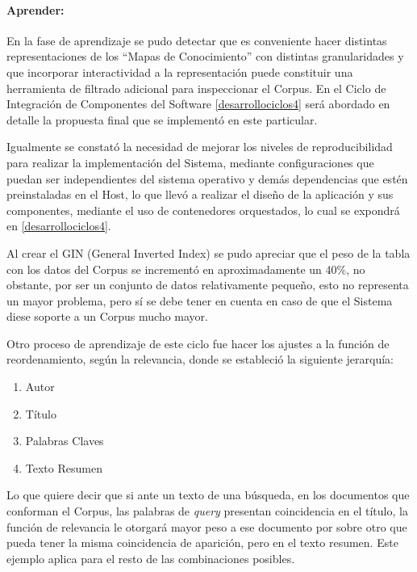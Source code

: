 \documentclass[
  12pt,
  openany]{book}
\begin{document}
\hypertarget{aprender-4}{%
\paragraph{Aprender:}\label{aprender-4}}

En la fase de aprendizaje se pudo detectar que es conveniente hacer distintas representaciones de los ``Mapas de Conocimiento'' con distintas granularidades y que incorporar interactividad a la representación puede constituir una herramienta de filtrado adicional para inspeccionar el Corpus. En el Ciclo de Integración de Componentes del Software \ref{desarrollociclos4} será abordado en detalle la propuesta final que se implementó en este particular.

Igualmente se constató la necesidad de mejorar los niveles de reproducibilidad para realizar la implementación del Sistema, mediante configuraciones que puedan ser independientes del sistema operativo y demás dependencias que estén preinstaladas en el Host, lo que llevó a realizar el diseño de la aplicación y sus componentes, mediante el uso de contenedores orquestados, lo cual se expondrá en \ref{desarrollociclos4}.

Al crear el GIN (General Inverted Index) se pudo apreciar que el peso de la tabla con los datos del Corpus se incrementó en aproximadamente un 40\%, no obstante, por ser un conjunto de datos relativamente pequeño, esto no representa un mayor problema, pero sí se debe tener en cuenta en caso de que el Sistema diese soporte a un Corpus mucho mayor.

Otro proceso de aprendizaje de este ciclo fue hacer los ajustes a la función de reordenamiento, según la relevancia, donde se estableció la siguiente jerarquía:

\begin{enumerate}
\def\labelenumi{\arabic{enumi}.}
\item
  Autor
\item
  Título
\item
  Palabras Claves
\item
  Texto Resumen
\end{enumerate}

Lo que quiere decir que si ante un texto de una búsqueda, en los documentos que conforman el Corpus, las palabras de \emph{query} presentan coincidencia en el título, la función de relevancia le otorgará mayor peso a ese documento por sobre otro que pueda tener la misma coincidencia de aparición, pero en el texto resumen. Este ejemplo aplica para el resto de las combinaciones posibles.
\end{document}
